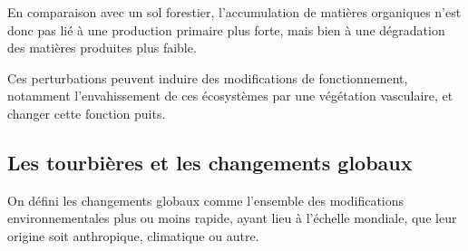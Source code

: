 En comparaison avec un sol forestier, l'accumulation de matières organiques n'est donc pas lié à une production primaire plus forte, mais bien à une dégradation des matières produites plus faible.

Ces perturbations peuvent induire des modifications de fonctionnement, notamment l'envahissement de ces écosystèmes par une végétation vasculaire, et changer cette fonction puits.

%



\subsection{Les tourbières et les changements globaux}
On défini les changements globaux comme l'ensemble des modifications environnementales plus ou moins rapide, ayant lieu à l'échelle mondiale, que leur origine soit anthropique, climatique ou autre.
